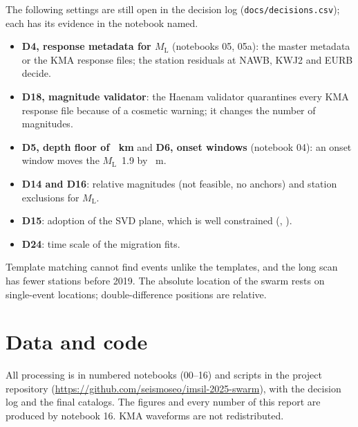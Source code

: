 \documentclass[11pt,a4paper]{article}
\newcommand{\ML}{\ensuremath{M_\mathrm{L}}}
\begin{document}
The following settings are still open in the decision log (\texttt{docs/decisions.csv}); each has its evidence in the notebook named.
\begin{itemize}
\item \textbf{D4, response metadata for \ML} (notebooks 05, 05a): the master metadata or the KMA response files; the station residuals at NAWB, KWJ2 and EURB decide.
\item \textbf{D18, magnitude validator}: the Haenam validator quarantines every KMA response file because of a cosmetic warning; it changes the number of magnitudes.
\item \textbf{D5, depth floor of ~km} and \textbf{D6, onset windows} (notebook 04): an onset window moves the \ML\ 1.9 by ~m.
\item \textbf{D14 and D16}: relative magnitudes (not feasible, no anchors) and station exclusions for \ML.
\item \textbf{D15}: adoption of the SVD plane, which is well constrained (, ).
\item \textbf{D24}: time scale of the migration fits.
\end{itemize}
Template matching cannot find events unlike the templates, and the long scan has fewer stations before 2019. The absolute location of the swarm rests on single-event locations; double-difference positions are relative.

\section{Data and code}

All processing is in numbered notebooks (00--16) and scripts in the project repository (\url{https://github.com/seismoseo/imsil-2025-swarm}), with the decision log and the final catalogs. The figures and every number of this report are produced by notebook 16. KMA waveforms are not redistributed.



\end{document}
